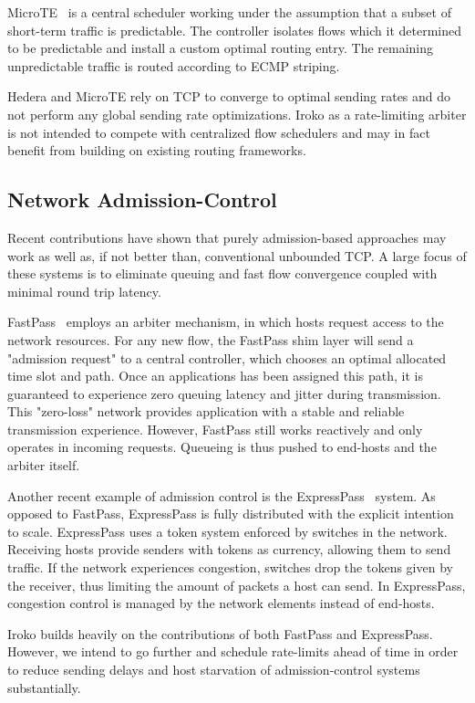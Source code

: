 MicroTE~\cite{microte} is a central scheduler working under the 
assumption that a subset of short-term traffic is predictable. The controller 
isolates flows which it determined to be predictable and install a custom 
optimal routing entry. The remaining unpredictable traffic is routed according 
to ECMP striping.

Hedera and MicroTE rely on TCP to converge to optimal sending rates and do not 
perform any global sending rate optimizations.
Iroko as a rate-limiting arbiter is not intended to compete with centralized 
flow schedulers and may in fact benefit from building on existing routing 
frameworks.

\subsection{Network Admission-Control}
Recent contributions have shown that purely admission-based approaches 
may work as well as, if not better than, conventional unbounded TCP. A large 
focus of these systems is to eliminate queuing and fast flow 
convergence coupled with minimal round trip latency.

FastPass~\cite{fastpass} employs an arbiter mechanism, in which hosts request 
access to the network resources. For any new flow, the FastPass shim layer will 
send a "admission request" to a central controller, which chooses an optimal 
allocated time slot and path. Once an applications has been assigned this path, 
it is guaranteed to experience zero queuing latency and jitter during 
transmission. This "zero-loss" network provides application with a stable and 
reliable transmission experience. However, FastPass still works reactively and 
only operates in incoming requests. Queueing is thus pushed to end-hosts and 
the arbiter itself.

Another recent example of admission control is the 
ExpressPass~\cite{expresspass} system. As opposed to FastPass, ExpressPass is 
fully distributed with the explicit intention to scale. ExpressPass uses a 
token system enforced by switches in the network. Receiving hosts provide 
senders with tokens as currency, allowing them to send traffic. If the network 
experiences congestion, switches drop the tokens given by the receiver, thus 
limiting the amount of packets a host can send. In ExpressPass, congestion 
control is managed by the network elements instead of end-hosts.

Iroko builds heavily on the contributions of both FastPass and ExpressPass. 
However, we intend to go further and schedule rate-limits ahead of time in 
order to reduce sending delays and host starvation of admission-control systems 
substantially.



